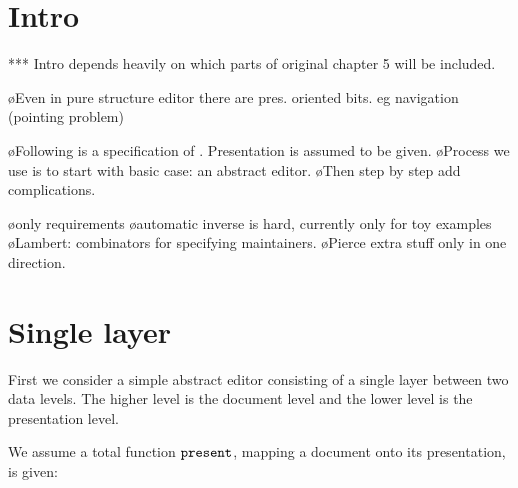 %																
%																
%																


%																
%																
%																
\section{Intro}

\toHere


*** Intro depends heavily on which parts of original chapter 5 will be included.


\bl
\o Even in pure structure editor there are pres. oriented bits. eg navigation (pointing problem)
\el

\bl
\o Following is a specification of \interpret. Presentation is assumed to be given.
\o Process we use is to start with basic case: an abstract editor. 
\o Then step by step add complications.
\el

\bl
\o only requirements
\o automatic inverse is hard, currently only for toy examples
\o Lambert: combinators for specifying maintainers. 
\o Pierce  extra stuff only in one direction.
\el


\fromHere


%																
%																
%																
\section{Single layer} \label{sect:singleSimple}

First we consider a simple abstract editor consisting of a single layer between two data levels. The higher level is the document level and the lower level is the presentation level. 

We assume a total function ${\tt present}$, mapping a document onto its presentation, is given:

